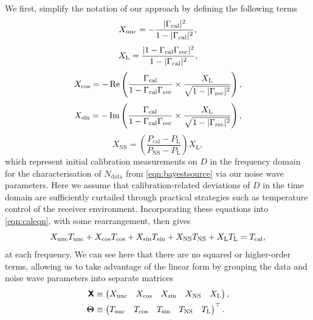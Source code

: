 We first, simplify the notation of our approach by defining the following terms
\begin{equation}\label{eqn:xunc}
  X_{\mathrm{unc}} = -\frac{|\Gamma_{\mathrm{cal}}|^2}{ 1-|\Gamma_{\mathrm{cal}}|^2}, 
\end{equation}
\begin{equation}\label{eqn:xl}
  X_{\mathrm{L}} = \frac{|1-\Gamma_{\mathrm{cal}}\Gamma_{\mathrm{rec}}|^2}{1-|\Gamma_{\mathrm{cal}}|^2},
\end{equation}
\begin{equation}\label{eqn:xcos}
  X_{\mathrm{cos}} = -\operatorname{Re}\left(\frac{\Gamma_{\mathrm{cal}}}{1-\Gamma_{\mathrm{cal}}\Gamma_{\mathrm{rec}}} \times \frac{X_{\mathrm{L}}}{\sqrt{1-|\Gamma_{\mathrm{rec}}|^2}}\right),
\end{equation}
\begin{equation}\label{eqn:xsin}
  X_{\mathrm{sin}} = -\operatorname{Im}\left(\frac{\Gamma_{\mathrm{cal}}}{1-\Gamma_{\mathrm{cal}}\Gamma_{\mathrm{rec}}} \times \frac{X_{\mathrm{L}}}{\sqrt{1-|\Gamma_{\mathrm{rec}}|^2}}\right),
\end{equation}
\begin{equation}\label{eqn:xns}
  X_{\mathrm{NS}} = \left( \frac{P_{\mathrm{cal}}-P_{\mathrm{L}}}{P_{\mathrm{NS}}-P_{\mathrm{L}}} \right) X_{\mathrm{L}},
\end{equation}
which represent initial calibration measurements on $D$ in the frequency domain for the characterisation of $N_{\mathrm{data}}$ from \cref{eqn:bayestsource} via our noise wave parameters. Here we assume that calibration-related deviations of $D$ in the time domain are sufficiently curtailed through practical strategies such as temperature control of the receiver environment. Incorporating these equations into \cref{eqn:caleqn}, with some rearrangement, then gives
\begin{equation}
  X_{\mathrm{unc}}T_{\mathrm{unc}} + X_{\mathrm{cos}}T_{\mathrm{cos}} + X_{\mathrm{sin}}T_{\mathrm{sin}} + X_{\mathrm{NS}}T_{\mathrm{NS}} + X_{\mathrm{L}}T_{\mathrm{L}} = T_{\mathrm{cal}},
\end{equation}
at each frequency. We can see here that there are no squared or higher-order terms, allowing us to take advantage of the linear form by grouping the data and noise wave parameters into separate matrices
\begin{equation} \label{eqn:theta}
    \begin{split}
    \textbf{\textsf{X}} &\equiv \begin{pmatrix} 
        X_\mathrm{unc} \quad 
        X_\mathrm{cos} \quad
        X_\mathrm{sin} \quad
        X_\mathrm{NS} \quad
        X_\mathrm{L} \end{pmatrix}, \\
    \boldsymbol{\Theta} &\equiv \begin{pmatrix} 
        T_\mathrm{unc}\quad
        T_\mathrm{cos}\quad
        T_\mathrm{sin}\quad
        T_\mathrm{NS}\quad
        T_\mathrm{L}\end{pmatrix}^\top.
    \end{split}
\end{equation}

